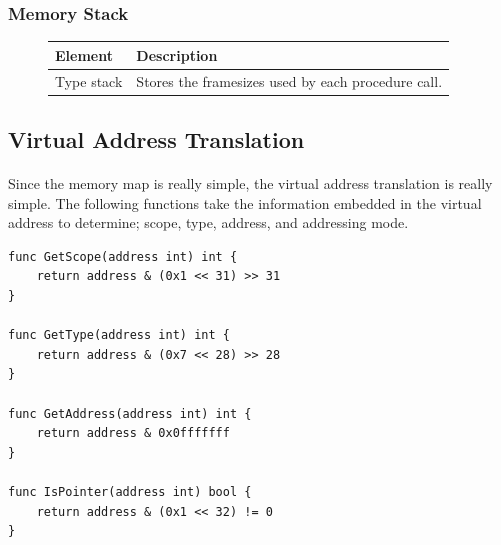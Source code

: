 \subsubsection{Memory Stack}

\begin{figure}[h]
    \centering
    \begin{tabular}{p{1in}p{3in}}
        \toprule
        \textbf{Element} & \textbf{Description}\\
        \midrule Type stack &
        Stores the framesizes used by each procedure call.\\
        
        \bottomrule
    \end{tabular}
\end{figure}

\newpage

\subsection{Virtual Address Translation}

\paragraph{} Since the memory map is really simple, the virtual address
translation is really simple. The following functions take the information
embedded in the virtual address to determine; scope, type, address, and
addressing mode.

\begin{verbatim}
func GetScope(address int) int {
    return address & (0x1 << 31) >> 31
}

func GetType(address int) int {
    return address & (0x7 << 28) >> 28
}

func GetAddress(address int) int {
    return address & 0x0fffffff
}

func IsPointer(address int) bool {
    return address & (0x1 << 32) != 0
}

\end{verbatim}

